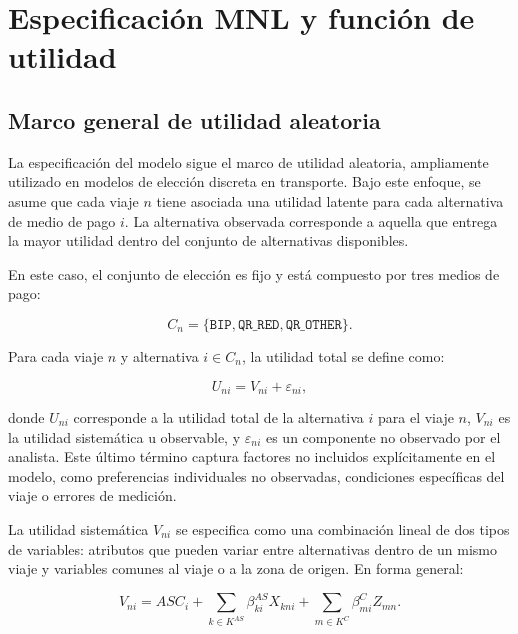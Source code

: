\section{Especificación MNL y función de utilidad}

\subsection{Marco general de utilidad aleatoria}

La especificación del modelo sigue el marco de utilidad aleatoria, ampliamente utilizado en modelos de elección discreta en transporte. Bajo este enfoque, se asume que cada viaje \(n\) tiene asociada una utilidad latente para cada alternativa de medio de pago \(i\). La alternativa observada corresponde a aquella que entrega la mayor utilidad dentro del conjunto de alternativas disponibles.

En este caso, el conjunto de elección es fijo y está compuesto por tres medios de pago:

\begin{equation}
    C_n = \{\texttt{BIP}, \texttt{QR\_RED}, \texttt{QR\_OTHER}\}.
\end{equation}

Para cada viaje \(n\) y alternativa \(i \in C_n\), la utilidad total se define como:

\begin{equation}
    U_{ni} = V_{ni} + \varepsilon_{ni},
\end{equation}

donde \(U_{ni}\) corresponde a la utilidad total de la alternativa \(i\) para el viaje \(n\), \(V_{ni}\) es la utilidad sistemática u observable, y \(\varepsilon_{ni}\) es un componente no observado por el analista. Este último término captura factores no incluidos explícitamente en el modelo, como preferencias individuales no observadas, condiciones específicas del viaje o errores de medición.

La utilidad sistemática \(V_{ni}\) se especifica como una combinación lineal de dos tipos de
variables: atributos que pueden variar entre alternativas dentro de un mismo viaje y variables
comunes al viaje o a la zona de origen. En forma general:

\begin{equation}
    V_{ni}
    =
    ASC_i
    +
    \sum_{k \in K^{AS}} \beta^{AS}_{ki} X_{kni}
    +
    \sum_{m \in K^{C}} \beta^{C}_{mi} Z_{mn}.
\end{equation}

